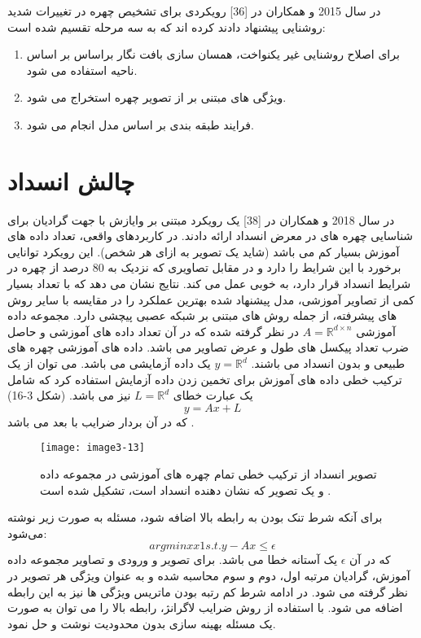 \noindent‏
در سال 2015  و همکاران در [36] رویکردی برای تشخیص چهره در تغییرات شدید روشنایی پیشنهاد دادند کرده اند که به سه مرحله تقسیم شده است:
\begin{enumerate}
\item
	برای اصلاح روشنایی غیر یکنواخت، همسان سازی بافت نگار براساس بر اساس ناحیه استفاده می شود.
\item 
	ویژگی های مبتنی بر  از تصویر چهره استخراج  می شود.
\item
فرایند طبقه بندی بر اساس مدل  انجام می شود.
\end{enumerate}
	
\section{چالش انسداد}
در سال 2018  و همکاران در [38] یک رویکرد مبتنی بر وايازش  با جهت گرادیان برای شناسایی چهره های در معرض انسداد ارائه دادند. در کاربردهای واقعی، تعداد داده های آموزش بسیار کم می باشد (شاید یک تصویر به ازای هر شخص). این رویکرد توانایی برخورد با این شرایط را دارد و در مقابل تصاویری که نزدیک به 80 درصد از چهره در شرایط انسداد قرار دارد، به خوبی عمل می کند. نتایج نشان می دهد که با تعداد بسیار کمی از تصاویر آموزشی، مدل پیشنهاد شده  بهترین عملکرد را در مقایسه با سایر روش های پیشرفته، از جمله روش های مبتنی بر شبکه عصبی پیچشی دارد. 
مجموعه داده  آموزشی
$A=\mathbb{R}^{d\times n}$
در نظر گرفته شده که در آن  تعداد داده های آموزشی و  حاصل ضرب تعداد پیکسل های طول و عرض تصاویر می باشد. داده های آموزشی چهره های طبیعی و بدون انسداد می باشند.
$y=\mathbb{R}^d$
یک داده آزمایشی می باشد. می توان از یک ترکیب خطی داده های آموزش برای تخمین زدن داده آزمایش استفاده کرد که شامل یک عبارت خطای
$L=\mathbb{R}^d$
نیز می باشد. (شکل 3-16) 
\begin{equation}\label{eq3-11}
y=Ax+L
\end{equation}
\noindent‏
که در آن  بردار ضرایب با  بعد می باشد.
 \begin{figure}[h]
\centering
  \texttt{[image: image3-13]}
  \caption{تصویر انسداد از ترکیب خطی تمام چهره های آموزشی در مجموعه داده و یک تصویر  که نشان دهنده انسداد است، تشکیل شده است \cite{ref1}.}
  \label{image2-1}
\end{figure}
\noindent
برای آنکه شرط تنک بودن به رابطه بالا اضافه شود، مسئله به صورت زیر نوشته می‌شود:
\begin{equation}\label{eq3-12}
argminxx1   s.t.y-Ax≤ϵ	
\end{equation}
\noindent‏
که در آن
$\epsilon$
یک آستانه خطا می باشد. برای تصویر و ورودی و تصاویر مجموعه داده آموزش، گرادیان مرتبه اول، دوم و سوم محاسبه شده و به عنوان ویژگی هر تصویر در نظر گرفته می شود. در ادامه شرط کم رتبه بودن ماتریس ویژگی ها نیز به این رابطه اضافه می شود. با استفاده از روش ضرایب لاگرانژ، رابطه بالا را می توان به صورت یک مسئله بهینه سازی بدون محدودیت نوشت و حل نمود.

